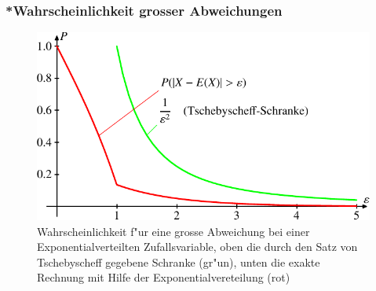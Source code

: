 \subsubsection{*Wahrscheinlichkeit grosser Abweichungen}
\begin{figure}
\begin{center}
\includegraphics{images/exp-1.pdf}
\end{center}
\caption{Wahrscheinlichkeit f"ur eine grosse Abweichung bei einer
Exponentialverteilten Zufallsvariable, oben die durch den Satz von Tschebyscheff
gegebene Schranke (gr"un), unten die exakte Rechnung mit
Hilfe der Exponentialvereteilung (rot)\label{abweichung-exponential}}
\end{figure}
